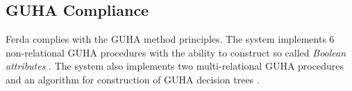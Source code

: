 \subsection{GUHA Compliance}
Ferda complies with the GUHA method principles. 
The system implements 6 non-relational GUHA procedures with the ability to construct so called \emph{Boolean attributes} \cite{Disjunctions}. 
The system also implements two multi-relational GUHA procedures \cite{Kuzmin} and an algorithm for construction of GUHA decision trees \cite{ETree}. 